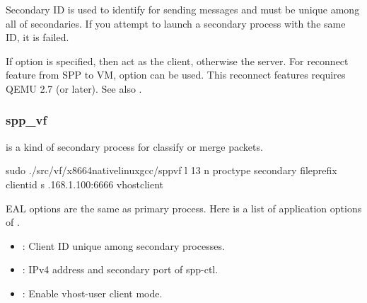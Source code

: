 \documentclass[a4paper,11pt,openany,oneside,english]{sphinxmanual}
\begin{document}
Secondary ID is used to identify for sending messages and must be
unique among all of secondaries.
If you attempt to launch a secondary process with the same ID, it
is failed.

If  option is specified, then  act as
the client, otherwise the server.
For reconnect feature from SPP to VM,  option can be
used. This reconnect features requires QEMU 2.7 (or later).
See also .


\subsubsection{spp\_vf}
\label{\detokenize{gsg/howto_use:spp-vf}}
 is a kind of secondary process for classify or merge packets.

\begin{sphinxVerbatim}[commandchars=\\\{\},formatcom=\footnotesize]
 sudo ./src/vf/x86\PYGZus{}64\PYGZhy{}native\PYGZhy{}linux\PYGZhy{}gcc/spp\PYGZus{}vf 
    \PYGZhy{}l \PYGZhy{}13 \PYGZhy{}n  
    \PYGZhy{}\PYGZhy{}proc\PYGZhy{}type secondary 
    \PYGZhy{}\PYGZhy{}file\PYGZhy{}prefix  
    \PYGZhy{}\PYGZhy{} 
    \PYGZhy{}\PYGZhy{}client\PYGZhy{}id  
    \PYGZhy{}s .168.1.100:6666 
    \PYGZhy{}\PYGZhy{}vhost\PYGZhy{}client
\end{sphinxVerbatim}

EAL options are the same as primary process. Here is a list of application
options of .
\begin{itemize}
\item {} 
: Client ID unique among secondary processes.

\item {} 
: IPv4 address and secondary port of spp-ctl.

\item {} 
: Enable vhost-user client mode.

\end{itemize}
\end{document}
